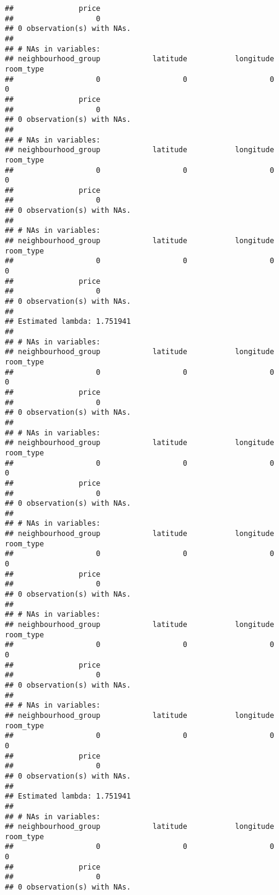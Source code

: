 \documentclass[
]{article}
\begin{document}
\begin{verbatim}
##               price 
##                   0 
## 0 observation(s) with NAs.
## 
## # NAs in variables:
## neighbourhood_group            latitude           longitude           room_type 
##                   0                   0                   0                   0 
##               price 
##                   0 
## 0 observation(s) with NAs.
## 
## # NAs in variables:
## neighbourhood_group            latitude           longitude           room_type 
##                   0                   0                   0                   0 
##               price 
##                   0 
## 0 observation(s) with NAs.
## 
## # NAs in variables:
## neighbourhood_group            latitude           longitude           room_type 
##                   0                   0                   0                   0 
##               price 
##                   0 
## 0 observation(s) with NAs.
## 
## Estimated lambda: 1.751941 
## 
## # NAs in variables:
## neighbourhood_group            latitude           longitude           room_type 
##                   0                   0                   0                   0 
##               price 
##                   0 
## 0 observation(s) with NAs.
## 
## # NAs in variables:
## neighbourhood_group            latitude           longitude           room_type 
##                   0                   0                   0                   0 
##               price 
##                   0 
## 0 observation(s) with NAs.
## 
## # NAs in variables:
## neighbourhood_group            latitude           longitude           room_type 
##                   0                   0                   0                   0 
##               price 
##                   0 
## 0 observation(s) with NAs.
## 
## # NAs in variables:
## neighbourhood_group            latitude           longitude           room_type 
##                   0                   0                   0                   0 
##               price 
##                   0 
## 0 observation(s) with NAs.
## 
## # NAs in variables:
## neighbourhood_group            latitude           longitude           room_type 
##                   0                   0                   0                   0 
##               price 
##                   0 
## 0 observation(s) with NAs.
## 
## Estimated lambda: 1.751941 
## 
## # NAs in variables:
## neighbourhood_group            latitude           longitude           room_type 
##                   0                   0                   0                   0 
##               price 
##                   0 
## 0 observation(s) with NAs.

\end{verbatim}
\end{document}
